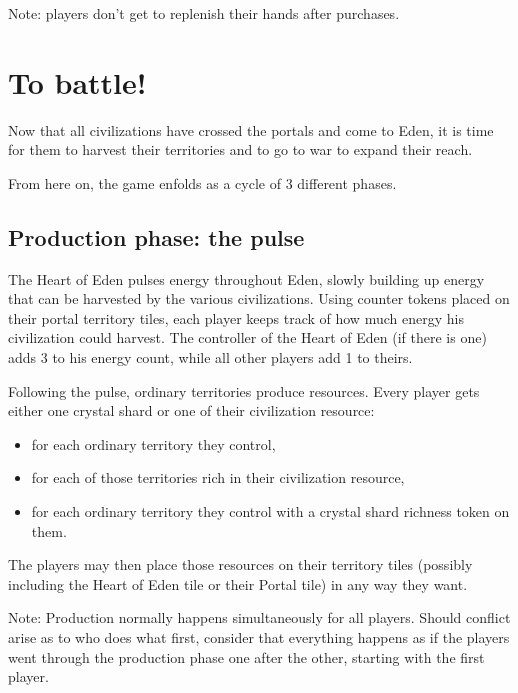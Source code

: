 \documentclass[a4paper]{article}
\begin{document}
        Note: players don't get to replenish their hands after purchases.


\section{To battle!}

    Now that all civilizations have crossed the portals and come to Eden,
    it is time for them to harvest their territories and to go to war to expand
    their reach.
    
    From here on, the game enfolds as a cycle of 3 different phases.
    
    \subsection{Production phase: the pulse}
        \label{prod}
        The Heart of Eden pulses energy throughout Eden,
        slowly building up energy that can be harvested by the various civilizations.
        Using counter tokens placed on their portal territory tiles,
        each player keeps track of how much energy his civilization could harvest.      
        The controller of the Heart of Eden (if there is one) adds 3 to his energy count,
        while all other players add 1 to theirs.
    
        Following the pulse, ordinary territories produce resources.
        Every player gets either one crystal shard or one of their civilization resource:
        \vspace{-1.3em}
        \begin{itemize}
            \item for each ordinary territory they control,
            \item for each of those territories rich in their civilization resource,
            \item for each ordinary territory they control with a crystal shard richness
                token on them.
        \end{itemize}
        
        The players may then place those resources on their territory tiles
        (possibly including the Heart of Eden tile or their Portal tile)
        in any way they want.
        
        Note: Production normally happens simultaneously for all players.
        Should conflict arise as to who does what first,
        consider that everything happens as if the players went through
        the production phase one after the other, starting with the first player.
\end{document}
